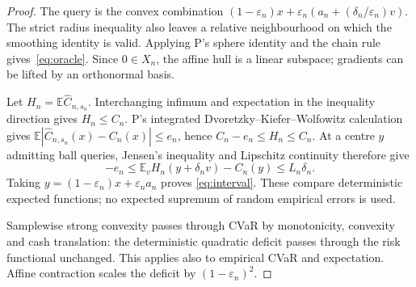 \documentclass{article}
\begin{document}
\begin{proof}
The query is the convex combination
\((1-\varepsilon_n)x+\varepsilon_n(a_n+(\delta_n/\varepsilon_n)v)\).
The strict radius inequality also leaves a relative neighbourhood on which
the smoothing identity is valid. Applying P's sphere identity and the chain
rule gives~\eqref{eq:oracle}. Since \(0\in X_n\), the affine hull is a
linear subspace; gradients can be lifted by an orthonormal basis.

Let \(H_n=\mathbb E\widehat C_{n,s_n}\). Interchanging infimum and
expectation in the inequality direction gives \(H_n\le C_n\).
P's integrated Dvoretzky--Kiefer--Wolfowitz calculation gives
\(\mathbb E|\widehat C_{n,s_n}(x)-C_n(x)|\le e_n\), hence
\(C_n-e_n\le H_n\le C_n\).
At a centre \(y\) admitting ball queries, Jensen's inequality and
Lipschitz continuity therefore give
\begin{equation}\label{eq:centred}
 -e_n\le\mathbb E_v H_n(y+\delta_nv)-C_n(y)\le L_n\delta_n.
\end{equation}
Taking \(y=(1-\varepsilon_n)x+\varepsilon_na_n\) proves
\eqref{eq:interval}. These compare deterministic expected functions;
no expected supremum of random empirical errors is used.

Samplewise strong convexity passes through CVaR by monotonicity,
convexity and cash translation: the deterministic quadratic deficit
passes through the risk functional unchanged. This applies also to
empirical CVaR and expectation. Affine contraction scales the deficit
by \((1-\varepsilon_n)^2\).
\end{proof}
\end{document}
